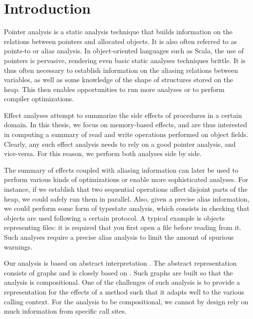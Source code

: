 \chapter{Introduction} \label{chap:intro}
Pointer analysis is a static analysis technique that builds information on the
relations between pointers and allocated objects. It is also often referred to
as points-to or alias analysis.
In object-oriented languages such as Scala, the use of pointers is
pervasive, rendering even basic static analyses techniques brittle. It is
thus often necessary to establish information on the aliasing relations between
variables, as well as some knowledge of the shape of structures stored on the
heap. This then enables opportunities to run more analyses or to perform
compiler optimizations.

Effect analyses attempt to summarize the side effects of procedures in a certain
domain. In this thesis, we focus on memory-based effects, and are thus interested
in computing a summary of read and write operations performed on object fields.
Clearly, any such effect analysis needs to rely on a good pointer analysis,
and vice-versa. For this reason, we perform both analyses side by side.

The summary of effects coupled with aliasing information can later be used to
perform various kinds of optimizations or enable more sophisticated analyses.
For instance, if we establish that two sequential operations affect disjoint
parts of the heap, we could safely run them in parallel. Also, given a precise
alias information, we could perform some form of typestate analysis, which
consists in checking that objects are used following a certain protocol. A
typical example is objects representing files: it is required that you first
open a file before reading from it. Such
analyses\cite{DBLP:journals/tosem/FinkYDRG08} require a precise alias analysis
to limit the amount of spurious warnings.

Our analysis is based on abstract interpretation
\cite{DBLP:conf/popl/CousotC77,DBLP:conf/popl/CousotC02}. The abstract
representation consists of graphs and is closely based on \cite{Salcianu2006}.
Such graphs are built so that the analysis is compositional. One of the
challenges of such analysis is to provide a representation for the effects of
a method such that it adapts well to the various calling context. For the
analysis to be compositional, we cannot by design rely on much information from
specific call sites.


